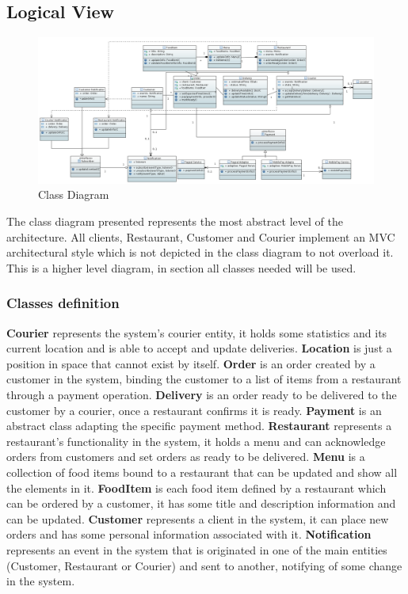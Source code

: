 \subsection{Logical View}

\begin{figure}[h!]
\begin{center}
\includegraphics[scale=0.25]{FIGS/ClassDiagram.PNG}
    \caption{Class Diagram}
    \label{fi7g:class_diag}
\end{center}
\end{figure}

The class diagram presented represents the most abstract level of the architecture. All clients, Restaurant, Customer and Courier implement an MVC architectural style which is not depicted in the class diagram to not overload it. This is a higher level diagram, in section \label{seq_diag} all classes needed will be used.

\subsubsection{Classes definition}
\textbf{Courier} represents the system's courier entity, it holds some statistics and its current location and is able to accept and update deliveries. \textbf{Location} is just a position in space that cannot exist by itself. \textbf{Order} is an order created by a customer in the system, binding the customer to a list of items from a restaurant through a payment operation. \textbf{Delivery} is an order ready to be delivered to the customer by a courier, once a restaurant confirms it is ready. \textbf{Payment} is an abstract class adapting the specific payment method. \textbf{Restaurant} represents a restaurant's functionality in the system, it holds a menu and can acknowledge orders from customers and set orders as ready to be delivered. \textbf{Menu} is a collection of food items bound to a restaurant that can be updated and show all the elements in it. \textbf{FoodItem} is each food item defined by a restaurant which can be ordered by a customer, it has some title and description information and can be updated. \textbf{Customer} represents a client in the system, it can place new orders and has some personal information associated with it. \textbf{Notification} represents an event in the system that is originated in one of the main entities (Customer, Restaurant or Courier) and sent to another, notifying of some change in the system.

